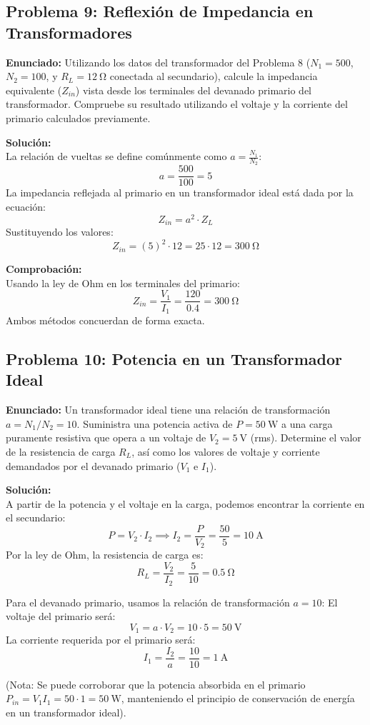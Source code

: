\documentclass[12pt, a4paper]{article}
\begin{document}
\subsection*{Problema 9: Reflexión de Impedancia en Transformadores}
\textbf{Enunciado:} Utilizando los datos del transformador del Problema 8 ($N_1 = 500$, $N_2 = 100$, y $R_L = \SI{12}{\ohm}$ conectada al secundario), calcule la impedancia equivalente ($Z_{in}$) vista desde los terminales del devanado primario del transformador. Compruebe su resultado utilizando el voltaje y la corriente del primario calculados previamente.

\textbf{Solución:}\\
La relación de vueltas se define comúnmente como $a = \frac{N_1}{N_2}$:
\[ a = \frac{500}{100} = 5 \]
La impedancia reflejada al primario en un transformador ideal está dada por la ecuación:
\[ Z_{in} = a^2 \cdot Z_L \]
Sustituyendo los valores:
\[ Z_{in} = (5)^2 \cdot 12 = 25 \cdot 12 = \SI{300}{\ohm} \]

\textbf{Comprobación:}\\
Usando la ley de Ohm en los terminales del primario:
\[ Z_{in} = \frac{V_1}{I_1} = \frac{120}{0.4} = \SI{300}{\ohm} \]
Ambos métodos concuerdan de forma exacta.

\subsection*{Problema 10: Potencia en un Transformador Ideal}
\textbf{Enunciado:} Un transformador ideal tiene una relación de transformación $a = N_1 / N_2 = 10$. Suministra una potencia activa de $P = \SI{50}{\watt}$ a una carga puramente resistiva que opera a un voltaje de $V_2 = \SI{5}{\volt}$ (rms). Determine el valor de la resistencia de carga $R_L$, así como los valores de voltaje y corriente demandados por el devanado primario ($V_1$ e $I_1$).

\textbf{Solución:}\\
A partir de la potencia y el voltaje en la carga, podemos encontrar la corriente en el secundario:
\[ P = V_2 \cdot I_2 \implies I_2 = \frac{P}{V_2} = \frac{50}{5} = \SI{10}{\ampere} \]
Por la ley de Ohm, la resistencia de carga es:
\[ R_L = \frac{V_2}{I_2} = \frac{5}{10} = \SI{0.5}{\ohm} \]

Para el devanado primario, usamos la relación de transformación $a = 10$:
El voltaje del primario será:
\[ V_1 = a \cdot V_2 = 10 \cdot 5 = \SI{50}{\volt} \]
La corriente requerida por el primario será:
\[ I_1 = \frac{I_2}{a} = \frac{10}{10} = \SI{1}{\ampere} \]

(Nota: Se puede corroborar que la potencia absorbida en el primario $P_{in} = V_1 I_1 = 50 \cdot 1 = \SI{50}{\watt}$, manteniendo el principio de conservación de energía en un transformador ideal).
\end{document}
